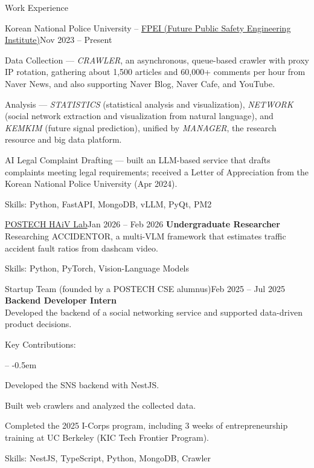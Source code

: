 \documentclass{resume}
\begin{document}
\begin{rSection}{Work Experience}
\begin{rSubsection}{Korean National Police University -- \href{https://knpu.re.kr/}{FPEI (Future Public Safety Engineering Institute)}}{Nov 2023 -- Present}
		\item Data Collection --- \textit{CRAWLER}, an asynchronous, queue-based crawler with proxy IP rotation, gathering about 1,500 articles and 60,000+ comments per hour from Naver News, and also supporting Naver Blog, Naver Cafe, and YouTube.
		\item Analysis --- \textit{STATISTICS} (statistical analysis and visualization), \textit{NETWORK} (social network extraction and visualization from natural language), and \textit{KEMKIM} (future signal prediction), unified by \textit{MANAGER}, the research resource and big data platform.
		\item AI Legal Complaint Drafting --- built an LLM-based service that drafts complaints meeting legal requirements; received a Letter of Appreciation from the Korean National Police University (Apr 2024).
		\item Skills: Python, FastAPI, MongoDB, vLLM, PyQt, PM2
	\end{rSubsection}
	\begin{rSubsection}{\href{https://sites.google.com/view/haiv/}{POSTECH HAiV Lab}}{Jan 2026 -- Feb 2026}
		\textbf{Undergraduate Researcher}
		\\ [0.2em]
		Researching ACCIDENTOR, a multi-VLM framework that estimates traffic accident fault ratios from dashcam video.
		\item Skills: Python, PyTorch, Vision-Language Models
	\end{rSubsection}

	\begin{rSubsection}{Startup Team (founded by a POSTECH CSE alumnus)}{Feb 2025 -- Jul 2025}
		\textbf{Backend Developer Intern}
		\\ [0.2em]
		Developed the backend of a social networking service and supported data-driven product decisions.

		\item Key Contributions:
		\vspace{-0.5em}
		\begin{list}{--}{}
			\itemsep -0.5em
			\item Developed the SNS backend with NestJS.
			\item Built web crawlers and analyzed the collected data.
			\item Completed the 2025 I-Corps program, including 3 weeks of entrepreneurship training at UC Berkeley (KIC Tech Frontier Program).
		\end{list}
		\item Skills: NestJS, TypeScript, Python, MongoDB, Crawler
	\end{rSubsection}

\end{rSection}
\end{document}
